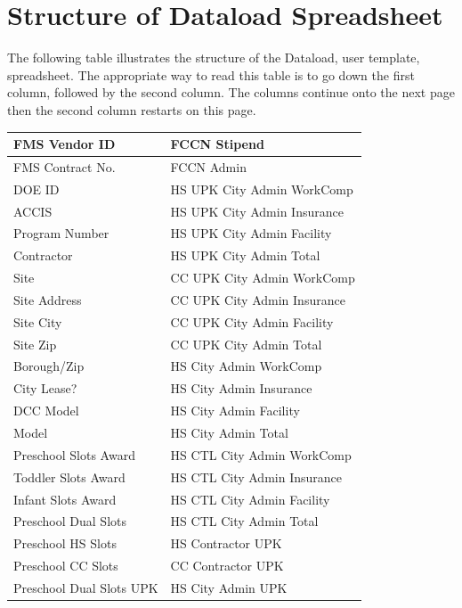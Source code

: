 \documentclass[12pt,a4paper]{report}
\begin{document}
    \section{Structure of Dataload Spreadsheet}
    The following table illustrates the structure of the Dataload, user template, spreadsheet. The appropriate way to read this table is to go down the first column, followed by the second column. The columns continue onto the next page then the second column restarts on this page.
     \begin{center}
        \begin{tabular}{|p{6.0cm}|p{6.0cm}|}
        \hline
        FMS Vendor ID & FCCN Stipend \\ \hline
        FMS Contract No. & FCCN Admin \\ \hline
        DOE ID &  HS UPK City Admin WorkComp \\ \hline
        ACCIS & HS UPK City Admin Insurance \\ \hline
        Program Number & HS UPK City Admin Facility \\ \hline 
        Contractor & HS UPK City Admin Total \\ \hline
        Site & CC UPK City Admin WorkComp \\ \hline
		Site Address & CC UPK City Admin Insurance \\ \hline
		Site City & CC UPK City Admin Facility \\ \hline 
		Site Zip & CC UPK City Admin Total \\ \hline
        Borough/Zip & HS City Admin WorkComp \\ \hline
		City Lease? & HS City Admin Insurance \\ \hline
        DCC Model & HS City Admin Facility \\ \hline
        Model & HS City Admin Total \\ \hline
		Preschool Slots Award & HS CTL City Admin WorkComp \\ \hline
		Toddler Slots Award & HS CTL City Admin Insurance \\ \hline
		Infant Slots Award & HS CTL City Admin Facility \\ \hline
        Preschool Dual Slots & HS CTL City Admin Total \\ \hline
		Preschool HS Slots & HS Contractor UPK \\ \hline
		Preschool CC Slots & CC Contractor UPK \\ \hline
		Preschool Dual Slots UPK & HS City Admin UPK \\ \hline

\end{tabular}
\end{center}
\end{document}
